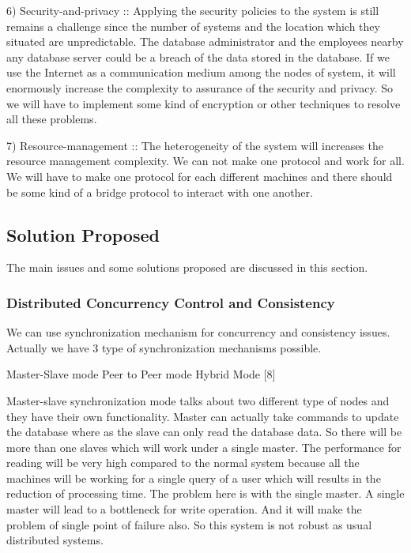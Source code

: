 \documentclass{article}[12pt,a4paper]
\begin{document}
6) Security-and-privacy :: Applying the security policies to the system is still remains a challenge since the number of systems and the location which they situated are unpredictable. The database administrator and the employees nearby any database server could be a breach of the data stored in the database. If we use the Internet as a communication medium among the nodes of system, it will enormously increase the complexity to assurance of the security and privacy. So we will have to implement some kind of encryption or other techniques to resolve all these problems.

7) Resource-management :: The heterogeneity of the system will increases the resource management complexity. We can not make one protocol and work for all. We will have to make one protocol for each different machines and there should be some kind of a bridge protocol to interact with one another.



\subsection {Solution Proposed}


The main issues and some solutions proposed are discussed in this section.

\subsubsection {Distributed Concurrency Control and Consistency}

We can use synchronization mechanism for concurrency and consistency issues. Actually we have 3 type of synchronization mechanisms possible.

Master-Slave mode
Peer to Peer mode
Hybrid Mode [8]

Master-slave synchronization mode talks about two different type of nodes and they have their own functionality. Master can actually take commands to update the database where as the slave can only read the database data. So there will be more than one slaves which will work under a single master. The performance for reading will be very high compared to the normal system because all the machines will be working for a single query of a user which will results in the reduction of processing time. The problem here is with the single master. A single master will lead to a bottleneck for write operation. And it will make the problem of single point of failure also. So this system is not robust as usual distributed systems.
\end{document}
